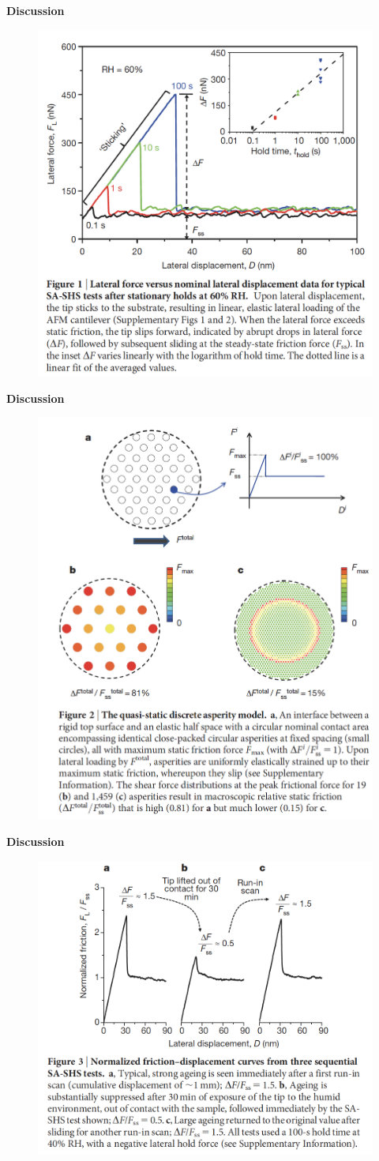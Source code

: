 \documentclass[11pt]{beamer}
\begin{document}
\begin{frame}{\textbf{Discussion}}
    \begin{figure}
        \includegraphics[width=0.6\linewidth]{images/1}
    \end{figure}
\end{frame}
\begin{frame}{\textbf{Discussion}}
    \begin{figure}
        \includegraphics[width=0.6\linewidth]{images/2}
    \end{figure}
\end{frame}
\begin{frame}{\textbf{Discussion}}
    \begin{figure}
        \includegraphics[width=0.6\linewidth]{images/3}
    \end{figure}
\end{frame}
\end{document}
